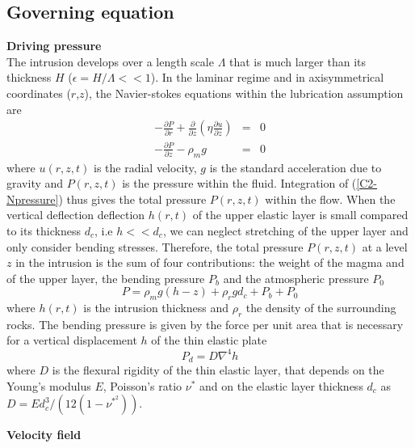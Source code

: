 \subsection{Governing equation}
\label{C2-sec:Governing equation}

\textbf{Driving pressure}\\

The  intrusion develops  over a  length scale  $\Lambda$ that  is much
larger than its  thickness $H$ ($\epsilon = H/ \Lambda<<  1$).  In the
laminar  regime  and  in  axisymmetrical  coordinates  ($r$,$z$),  the
Navier-stokes equations within the lubrication assumption are
\begin{eqnarray}
  -\frac{\partial P}{\partial r}  +  \frac{\partial}{\partial z}\left(\eta \frac{\partial u}{\partial z}\right) &=&0\label{C2_V1} \\
  -\frac{\partial P}{\partial z}  - \rho_{m}g&  =&0\label{C2-Npressure}
\end{eqnarray}
where  $u(r,z,t)$  is  the  radial   velocity,  $g$  is  the  standard
acceleration due to gravity and  $P(r,z,t)$ is the pressure within the
fluid.   Integration  of  (\ref{C2-Npressure}) thus  gives  the  total
pressure  $P(r,z,t)$ within  the flow.   When the  vertical deflection
deflection $h(r,t)$  of the upper  elastic layer is small  compared to
its thickness  $d_c$, i.e $h<<d_c$,  we can neglect stretching  of the
upper layer and only consider  bending stresses.  Therefore, the total
pressure $P(r,z,t)$ at a level $z$ in the intrusion is the sum of four
contributions: the  weight of the  magma and  of the upper  layer, the
bending pressure $P_b$ and the atmospheric pressure $P_0$
\begin{equation}
  P = \rho_m g (h-z)+\rho_rgd_c+P_b+P_0
  \label{C2-pression}
\end{equation}
where $h(r,t)$ is the intrusion  thickness and $\rho_r$ the density of
the surrounding rocks. The bending pressure  is given by the force per
unit area  that is necessary  for a  vertical displacement $h$  of the
thin elastic plate \citep{Turcotte:1982ca}
\begin{equation}
  P_d = D\nabla^4h
\end{equation}
where $D$  is the flexural  rigidity of  the thin elastic  layer, that
depends on the Young's modulus $E$, Poisson's ratio $\nu^*$ and on the
elastic           layer          thickness           $d_c$          as
$D = Ed_c^3/\left(12(1-\nu^*^2)\right)$.

\vspace{.5cm} \textbf{Velocity field} \vspace{.5cm}

